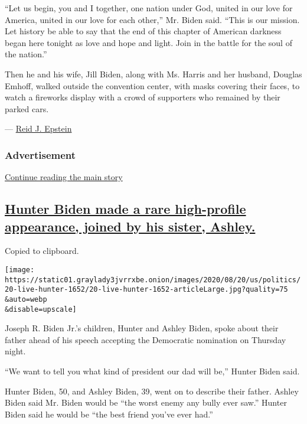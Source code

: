 ``Let us begin, you and I together, one nation under God, united in our
love for America, united in our love for each other,'' Mr. Biden said.
``This is our mission. Let history be able to say that the end of this
chapter of American darkness began here tonight as love and hope and
light. Join in the battle for the soul of the nation.''

Then he and his wife, Jill Biden, along with Ms. Harris and her husband,
Douglas Emhoff, walked outside the convention center, with masks
covering their faces, to watch a fireworks display with a crowd of
supporters who remained by their parked cars.

--- \href{https://www.nytimes3xbfgragh.onion/by/reid-j-epstein}{Reid J.
Epstein}

\hypertarget{advertisement}{%
\subsubsection{Advertisement}\label{advertisement}}

\protect\hyperlink{after-dfp-ad-mid1}{Continue reading the main story}

\hypertarget{hunter-biden-made-a-rare-high-profile-appearance-joined-by-his-sister-ashley}{%
\subsection{\texorpdfstring{\protect\hyperlink{hunter-biden-made-a-rare-high-profile-appearance-joined-by-his-sister-ashley}{Hunter
Biden made a rare high-profile appearance, joined by his sister,
Ashley.}}{Hunter Biden made a rare high-profile appearance, joined by his sister, Ashley.}}\label{hunter-biden-made-a-rare-high-profile-appearance-joined-by-his-sister-ashley}}

Copied to clipboard.

\texttt{[image: https://static01.graylady3jvrrxbe.onion/images/2020/08/20/us/politics/20-live-hunter-1652/20-live-hunter-1652-articleLarge.jpg?quality=75\\\&auto=webp\\\&disable=upscale]}

Joseph R. Biden Jr.'s children, Hunter and Ashley Biden, spoke about
their father ahead of his speech accepting the Democratic nomination on
Thursday night.

``We want to tell you what kind of president our dad will be,'' Hunter
Biden said.

Hunter Biden, 50, and Ashley Biden, 39, went on to describe their
father. Ashley Biden said Mr. Biden would be ``the worst enemy any bully
ever saw.'' Hunter Biden said he would be ``the best friend you've ever
had.''

